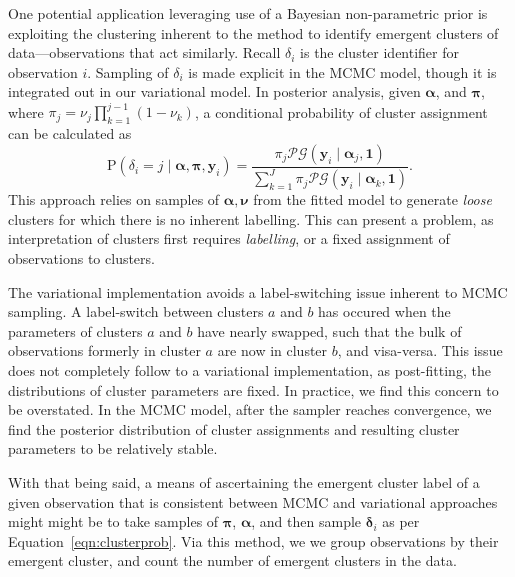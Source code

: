 One potential application leveraging use of a Bayesian non-parametric prior is 
    exploiting the clustering inherent to the method to identify emergent clusters of
    data---observations that act similarly.  Recall $\delta_i$ is the 
    cluster identifier for observation $i$.  Sampling of $\delta_i$ is made explicit in
    the MCMC model, though it is integrated out in our variational model. In
    posterior analysis, given $\bm{\alpha}$, and $\bm{\pi}$, where 
    $\pi_j = \nu_j\prod_{k = 1}^{j-1}(1 - \nu_k)$, a conditional probability of cluster 
    assignment can be calculated as
    \begin{equation}
        \label{eqn:clusterprob}
        \text{P}\left(\delta_i = j\mid\bm{\alpha},\bm{\pi},\bm{y}_i\right) 
            = \frac{\pi_j\mathcal{PG}(\bm{y}_i\mid\bm{\alpha}_j,\bm{1})}{
            \sum_{k = 1}^J \pi_j\mathcal{PG}(\bm{y}_i\mid\bm{\alpha}_k,\bm{1})}.
    \end{equation}
    This approach relies on samples of $\bm{\alpha},\bm{\nu}$ from the fitted
    model to generate \emph{loose} clusters for which there is no inherent 
    labelling.  This can present a problem, as interpretation of clusters first 
    requires \emph{labelling}, or a fixed assignment of observations to clusters.

The variational implementation avoids a label-switching issue inherent to 
    MCMC sampling.  A label-switch between clusters $a$ and $b$ has occured when
    the parameters of clusters $a$ and $b$ have nearly swapped, such that the
    bulk of observations formerly in cluster $a$ are now in cluster $b$, and 
    visa-versa.  This issue does not completely follow to a variational 
    implementation, as post-fitting, the distributions of cluster parameters are 
    fixed.  In practice, we find this concern to be overstated.  In the MCMC model,
    after the sampler reaches convergence, we find the posterior distribution of 
    cluster assignments and resulting cluster parameters to be relatively stable.

With that being said, a means of ascertaining the emergent cluster label of a
    given observation that is consistent between MCMC and variational approaches
    might might be to take samples of $\bm{\pi}$, $\bm{\alpha}$, and then sample
    $\bm{\delta}_i$ as per Equation~\eqref{eqn:clusterprob}.  Via this method, we
    we group observations by their emergent cluster, and count the number of emergent
    clusters in the data.

